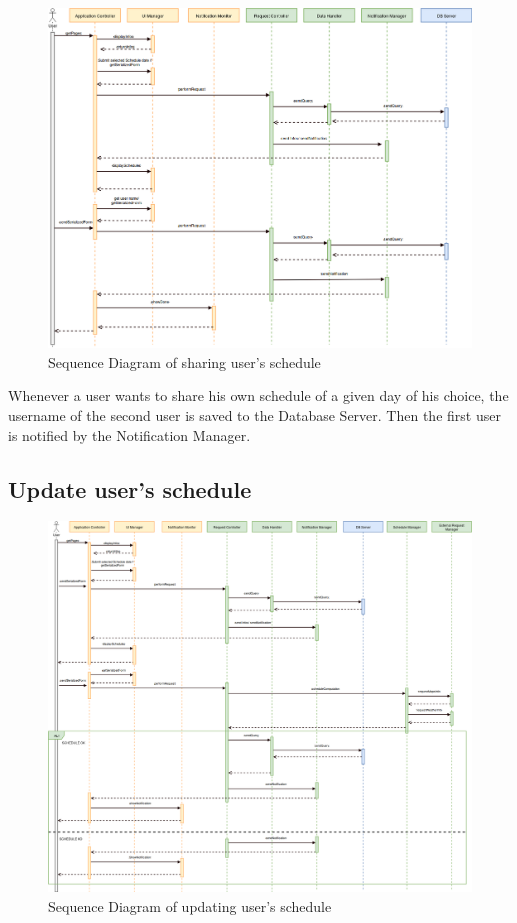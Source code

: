 \documentclass[numbers=noenddot, 12pt, a4paper, oneside]{scrbook}
\begin{document}
\begin{figure}[H]
	\centering
	\includegraphics[width=1.1\textwidth,angle=-0]{images/Goal6}
	\caption{Sequence Diagram of sharing user's schedule}
\end{figure}

Whenever a user wants to share his own schedule of a given day of his choice, the username of the second user is saved to the Database Server. Then the first user is notified by the Notification Manager.

\subsection*{Update user's schedule}

\begin{figure}[H]
	\centering
	\includegraphics[width=1.1\textwidth,angle=-0]{images/Goal7}
	\caption{Sequence Diagram of updating user's schedule}
\end{figure}
\end{document}
